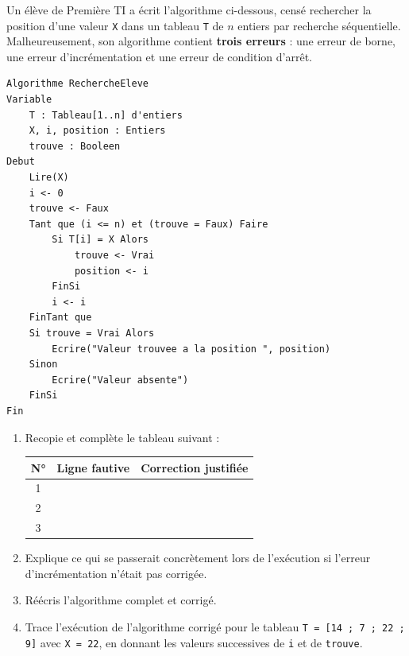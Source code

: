 \documentclass[11pt]{article}
\begin{document}
\begin{exercice}
Un élève de Première TI a écrit l'algorithme ci-dessous, censé rechercher la position d'une valeur \texttt{X} dans un tableau \texttt{T} de $n$ entiers par recherche séquentielle. Malheureusement, son algorithme contient \textbf{trois erreurs} : une erreur de borne, une erreur d'incrémentation et une erreur de condition d'arrêt.

\begin{lstlisting}
Algorithme RechercheEleve
Variable
    T : Tableau[1..n] d'entiers
    X, i, position : Entiers
    trouve : Booleen
Debut
    Lire(X)
    i <- 0
    trouve <- Faux
    Tant que (i <= n) et (trouve = Faux) Faire
        Si T[i] = X Alors
            trouve <- Vrai
            position <- i
        FinSi
        i <- i
    FinTant que
    Si trouve = Vrai Alors
        Ecrire("Valeur trouvee a la position ", position)
    Sinon
        Ecrire("Valeur absente")
    FinSi
Fin
\end{lstlisting}

\begin{enumerate}
\item Recopie et complète le tableau suivant :
\begin{center}
\begin{tabularx}{\linewidth}{|c|X|X|}
\hline
\rowcolor{popblueL} N° & Ligne fautive & Correction justifiée \\
\hline
1 & & \\
\hline
2 & & \\
\hline
3 & & \\
\hline
\end{tabularx}
\end{center}
\item Explique ce qui se passerait concrètement lors de l'exécution si l'erreur d'incrémentation n'était pas corrigée.
\item Réécris l'algorithme complet et corrigé.
\item Trace l'exécution de l'algorithme corrigé pour le tableau \texttt{T = [14 ; 7 ; 22 ; 9]} avec \texttt{X = 22}, en donnant les valeurs successives de \texttt{i} et de \texttt{trouve}.
\end{enumerate}
\end{exercice}
\end{document}
